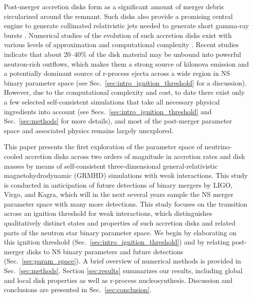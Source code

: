 Post-merger accretion disks form as a significant amount of merger debris circularized around the remnant. Such disks also provide a promising central engine to generate collimated relativistic jets needed to generate short gamma-ray bursts \cite{aloy_relativistic_2005,shibata_merger_2006,paschalidis_relativistic_2015,ruiz_binary_2016}. Numerical studies of the evolution of such accretion disks exist with various levels of approximation and computational complexity \cite{fernandez_delayed_2013,just_comprehensive_2015,siegel_three-dimensional_2017,fernandez_long-term_2019,christie_role_2019,miller_full_2019-1,fujibayashi_properties_2017,Fujibayashi:2020qda}. Recent studies indicate that about 20--40\% of the disk material may be unbound into powerful neutron-rich outflows, which makes them a strong source of kilonova emission and a potentially dominant source of r-process ejecta across a wide region in NS binary parameter space (see Sec.~\ref{sec:intro_ignition_threshold} for a discussion). However, due to the computational complexity and cost, to date there exist only a few selected self-consistent simulations \cite{siegel_three-dimensional_2017,siegel_three-dimensional_2018,fernandez_long-term_2019,christie_role_2019,miller_full_2019-1} that take all necessary physical ingredients into account (see Secs.~\ref{sec:intro_ignition_threshold} and Sec.~\ref{sec:methods} for more details), and most of the post-merger parameter space and associated physics remains largely unexplored.

This paper presents the first exploration of the parameter space of neutrino-cooled accretion disks across two orders of magnitude in accretion rates and disk masses by means of self-consistent three-dimensional general-relativistic magnetohydrodynamic (GRMHD) simulations with weak interactions. This study is conducted in anticipation of future detections of binary mergers by LIGO, Virgo, and Kagra, which will in the next several years sample the NS merger parameter space with many more detections. This study focuses on the transition across an ignition threshold for weak interactions, which distinguishes qualitatively distinct states and properties of such accretion disks and related parts of the neutron star binary parameter space. We begin by elaborating on this ignition threshold (Sec.~\ref{sec:intro_ignition_threshold}) and by relating post-merger disks to NS binary parameters and future detections (Sec.~\ref{sec:param_space}). A brief overview of numerical methods is provided in Sec.~\ref{sec:methods}. Section \ref{sec:results} summarizes our results, including global and local disk properties as well as r-process nucleosynthesis. Discussion and conclusions are presented in Sec.~\ref{sec:conclusion}.

